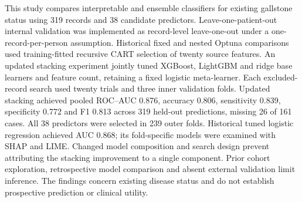 This study compares interpretable and ensemble classifiers for existing gallstone status using 319 records and 38 candidate predictors. Leave-one-patient-out internal validation was implemented as record-level leave-one-out under a one-record-per-person assumption. Historical fixed and nested Optuna comparisons used training-fitted recursive CART selection of twenty source features. An updated stacking experiment jointly tuned XGBoost, LightGBM and ridge base learners and feature count, retaining a fixed logistic meta-learner. Each excluded-record search used twenty trials and three inner validation folds. Updated stacking achieved pooled ROC--AUC 0.876, accuracy 0.806, sensitivity 0.839, specificity 0.772 and F1 0.813 across 319 held-out predictions, missing 26 of 161 cases. All 38 predictors were selected in 239 outer folds. Historical tuned logistic regression achieved AUC 0.868; its fold-specific models were examined with SHAP and LIME. Changed model composition and search design prevent attributing the stacking improvement to a single component. Prior cohort exploration, retrospective model comparison and absent external validation limit inference. The findings concern existing disease status and do not establish prospective prediction or clinical utility.
